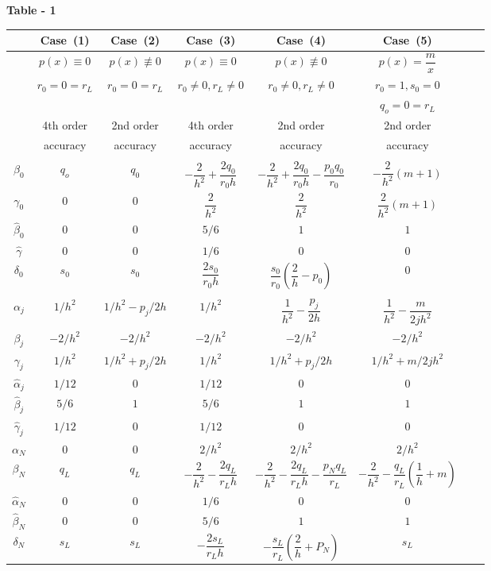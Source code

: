 {\fontsize{9}{11}\selectfont
\begin{center}
\textbf{Table - 1}\pageoriginale

\medskip
\renewcommand{\arraystretch}{1.6}
\tabcolsep=1.6pt
\begin{tabular}{cccccccc}
\hline
&Case~(1) & Case~(2) & Case~(3) & Case~(4) & Case~(5)\\
\hline
& $p(x)\equiv 0$ & $p(x)\not\equiv0$  & $p(x)\equiv 0$ &
$p(x)\not\equiv 0$ & $p(x)=\dfrac{m}{x}$\\ 
&$r_0=0=r_L$ & $r_0=0=r_L$ & $r_0\neq 0, r_L \neq 0$ & $ r_0\neq 0,
r_L \neq 0$ & $r_0=1,s_0=0$\\
& & & & & $ q_o = 0 = r_L$\\ 
& 4th order & 2nd order& 4th order & 2nd order & 2nd order\\
& accuracy & accuracy& accuracy & accuracy & accuracy \\ 
\hline
& & & & & & \\[-0.4cm]
 $\beta_0 $ & $q_o$ & $q_0$ & $-\dfrac{2}{h^2}+\dfrac{2q_0}{r_0 h}$ &
$-\dfrac{2}{h^2}+\dfrac{2q_0}{r_0h}-\dfrac{p_0q_0}{r_0}$ &
$-\dfrac{2}{h^2}(m+1)$\\[8pt]  
  $\gamma_0$ & $0$ & $0$ & $\dfrac{2}{h^2}$ & $\dfrac{2}{h^2}$ &
$\dfrac{2}{h^2}(m+1)$ \\[5pt] 
 \hline
 $\hat{\beta}_0$ & $0$ & $0$ & $5/6$ & $1$ & $1$\\
 $\hat{\gamma}$ & $0$ & $0$ & $1/6$ & $0$ & $0$\\
 $\delta_0$ & $s_0$ & $s_0$ & $\dfrac{2s_0}{r_0h}$ &
 $\dfrac{s_0}{r_0}(\dfrac{2}{h}-p_0)$ & $0$\\ 
 \hline
& & & & & & \\[-0.4cm]
 $\alpha_j$ & $1/h^2$ & $1/h^2 -p_j /2h$ &$1/h^2$&
 $\dfrac{1}{h^2}-\dfrac{p_j}{2h} $ & $\dfrac{1}{h^2}-
 \dfrac{m}{2jh^2}$\\ 
  $\beta_j$ & $-2/h^2$ & $-2/h^2$& $-2/h^2$& $-2/h^2$& $-2/h^2$\\ 
  $\gamma_j$ & $1/h^2$ &  $1/h^2 + p_j /2h$ & $1/h^2$ & $1/h^2 +p_j
 /2h$ & $1/h^2 + m /2jh^2$\\[5pt]
 \hline
 $\hat{\alpha}_j$ & $1/12$ & $0$ & $1/12$ & $0$ & $0$\\
  $\hat{\beta}_j$ & $5/6$ & $1$ & $5/6$ & $1$ & $1$\\
 $\hat{\gamma}_j$ & $1/12$ & $0$ & $1/12$ & $0$ & $0$\\
\hline
$\alpha_N$ & $0$ & $0$ & $2/h^2$ & $2/h^2$ & $2/h^2$  \\
$\beta_N$ & $q_L$ & $q_L$ & $- \dfrac{2}{h^2}- \dfrac{2q_L}{r_Lh}$ &
$- \dfrac{2}{h^2} - \dfrac{2q_L}{r_Lh} - \dfrac{p_Nq_L}{r_L}$ & \;\;$-
\dfrac{2}{h^2}- \dfrac{q_L}{r_L}(\dfrac{1}{h}+ m)$\\[6pt] 
\hline
$\hat{\alpha}_N$ & $0$ & $0$ & $1/6$ & $0$ & $0$\\
$\hat{\beta}_N$ & $0$ & $0$ & $5/6$ & $1$ & $1$\\
$\delta _N$  & $s_L$ & $s_L$ & $-\dfrac{2s_L}{r_Lh}$ &
$-\dfrac{s_L}{r_L}(\dfrac{2}{h}+P_N)$ & $s_L$\\[6pt] 
\hline
\end{tabular}
\end{center}}\relax

